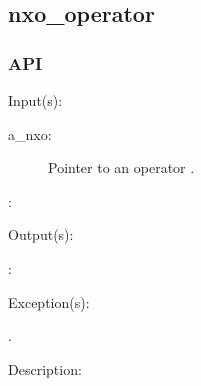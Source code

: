 %
%
%
%
%              

\subsection{nxo\_operator}
\label{nxo_operator}

\subsubsection{API}
\begin{capi}
\label{nxo_operator_}
	\begin{capilist}
	\item[Input(s): ]
		\begin{description}\item[]
		\item[a\_nxo: ]
			Pointer to an operator .
		\item[: ]
		\end{description}
	\item[Output(s): ]
		\begin{description}\item[]
		\item[: ]
		\end{description}
	\item[Exception(s): ]
		\begin{description}\item[]
		\item[.]
		\end{description}
	\item[Description: ]
	\end{capilist}
\end{capi}
